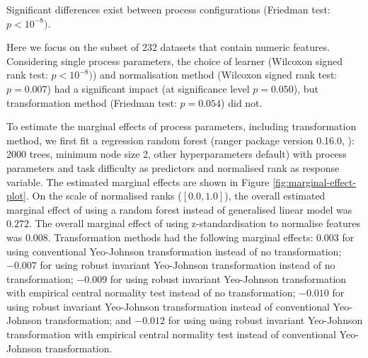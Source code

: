 \documentclass[preprint,12pt,authoryear]{elsarticle}
\begin{document}
Significant differences exist between process configurations (Friedman
test: \(p < 10^{-8})\).

Here we focus on the subset of 232 datasets that contain numeric
features. Considering single process parameters, the choice of learner
(Wilcoxon signed rank test: \(p < 10^{-8})\)) and normalisation method
(Wilcoxon signed rank test: \(p = 0.007\)) had a significant impact (at
significance level \(p = 0.050\)), but transformation method (Friedman
test: \(p = 0.054\)) did not.

To estimate the marginal effects of process parameters, including
transformation method, we first fit a regression random forest (ranger
package version 0.16.0, \citep{Wright2017-rf}): 2000 trees, minimum
node size 2, other hyperparameters default) with process parameters and
task difficulty as predictors and normalised rank as response variable.
The estimated marginal effects are shown in Figure
\ref{fig:marginal-effect-plot}. On the scale of normalised ranks
(\([0.0, 1.0]\)), the overall estimated marginal effect of using a
random forest instead of generalised linear model was \(0.272\). The
overall marginal effect of using z-standardisation to normalise features
was \(0.008\). Transformation methods had the following marginal
effects: \(0.003\) for using conventional Yeo-Johnson transformation
instead of no transformation; \(-0.007\) for using robust invariant
Yeo-Johnson transformation instead of no transformation; \(-0.009\) for
using robust invariant Yeo-Johnson transformation with empirical central
normality test instead of no transformation; \(-0.010\) for using robust
invariant Yeo-Johnson transformation instead of conventional Yeo-Johnson
transformation; and \(-0.012\) for using using robust invariant
Yeo-Johnson transformation with empirical central normality test instead
of conventional Yeo-Johnson transformation.
\end{document}
